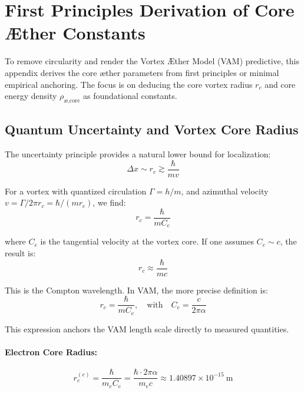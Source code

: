 \section{First Principles Derivation of Core \AE{}ther Constants}

To remove circularity and render the Vortex \AE{}ther Model (VAM) predictive, this appendix derives the core \ae{}ther parameters from first principles or minimal empirical anchoring. The focus is on deducing the core vortex radius $r_c$ and core energy density $\rho_{\text{\ae,core}}$ as foundational constants.

\subsection{ Quantum Uncertainty and Vortex Core Radius}

The uncertainty principle provides a natural lower bound for localization:
\begin{equation}
\Delta x \sim r_c \gtrsim \frac{\hbar}{m v}
\end{equation}

For a vortex with quantized circulation $\Gamma = h/m$, and azimuthal velocity $v = \Gamma / 2\pi r_c = \hbar / (m r_c)$, we find:
\begin{equation}
r_c = \frac{\hbar}{m C_e}
\end{equation}

where $C_e$ is the tangential velocity at the vortex core. If one assumes $C_e \sim c$, the result is:
\begin{equation}
r_c \approx \frac{\hbar}{m c}
\end{equation}

This is the Compton wavelength. In VAM, the more precise definition is:
\begin{equation}
r_c = \frac{\hbar}{m C_e}, \quad \text{with} \quad C_e = \frac{c}{2\pi \alpha}
\end{equation}

This expression anchors the VAM length scale directly to measured quantities.

\paragraph{Electron Core Radius:}
\begin{equation}
r_c^{(e)} = \frac{\hbar}{m_e C_e} = \frac{\hbar \cdot 2\pi \alpha}{m_e c} \approx 1.40897 \times 10^{-15} \ \text{m}
\end{equation}


